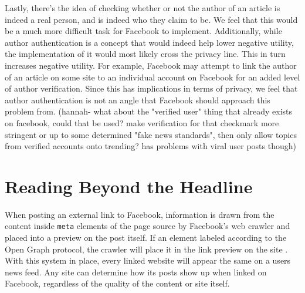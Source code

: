 \documentclass[12pt]{article}
\begin{document}
Lastly, there's the idea of checking whether or not the author of an article is indeed a real person, and is indeed who they claim to be. We feel that this would be a much more difficult task for Facebook to implement. Additionally, while author authentication is a concept that would indeed help lower negative utility, the implementation of it would most likely cross the privacy line. This in turn increases negative utility. For example, Facebook may attempt to link the author of an article on some site to an individual account on Facebook for an added level of author verification. Since this has implications in terms of privacy, we feel that author authentication is not an angle that Facebook should approach this problem from. (hannah- what about the "verified user" thing that already exists on facebook, could that be used? make verification for that checkmark more stringent or up to some determined "fake news standards", then only allow topics from verified accounts onto trending? has problems with viral user posts though)

\section{Reading Beyond the Headline}
When posting an external link to Facebook, information is drawn from the content inside \texttt{meta} elements of the page source by Facebook's web crawler and placed into a preview on the post itself. If an element labeled according to the Open Graph protocol, the crawler will place it in the link preview on the site \citep{fbwebmaster}. With this system in place, every linked website will appear the same on a users news feed. Any site can determine how its posts show up when linked on Facebook, regardless of the quality of the content or site itself. \\
\end{document}
